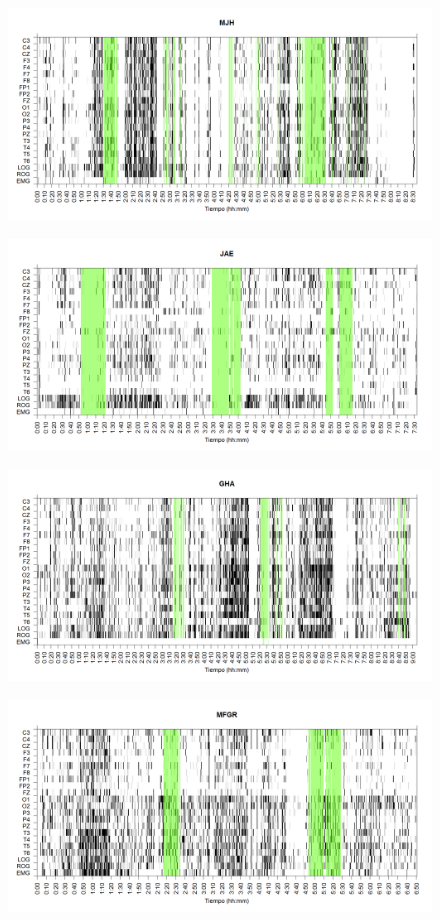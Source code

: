 \begin{figure}
\centering
\includegraphics[width=0.8\linewidth]
{./img_ejemplos/MJNNVIGILOS_est.png} 
\label{grf_MJH}
\end{figure}

\begin{figure}
\centering
\includegraphics[width=0.8\linewidth]
{./img_ejemplos/JANASUE_est.png} 
\label{grf_JAE}
\end{figure}

\begin{figure}
\centering
\includegraphics[width=0.8\linewidth]
{./img_ejemplos/GH24031950SUENNO_est.png} 
\label{grf_GHA}
\end{figure}

\begin{figure}
\centering
\includegraphics[width=0.8\linewidth]
{./img_ejemplos/GURM251148SUE_est.png} 
\label{grf_MFGR}
\end{figure}


